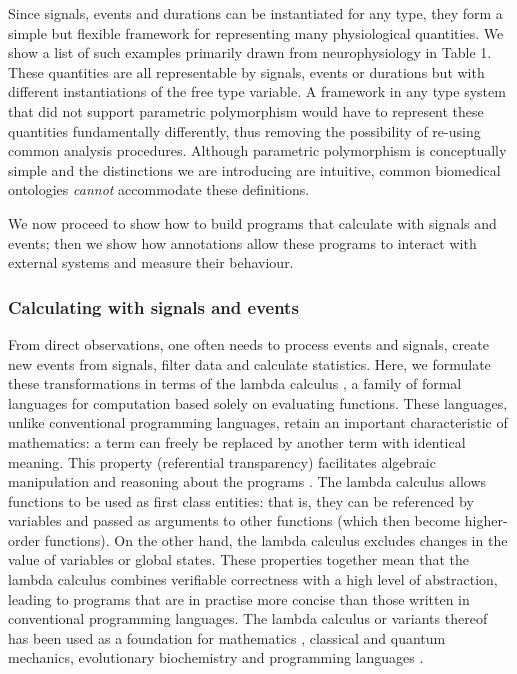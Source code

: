 \documentclass[11pt]{article}
\begin{document}
Since signals, events and durations can be instantiated for any type,
they form a simple but flexible framework for representing many
physiological quantities. We show a list of such examples primarily
drawn from neurophysiology in Table 1. These quantities are all
representable by signals, events or durations but with different
instantiations of the free type variable. A framework in any type
system that did not support parametric polymorphism would have to
represent these quantities fundamentally differently, thus removing
the possibility of re-using common analysis procedures. Although
parametric polymorphism is conceptually simple and the distinctions we
are introducing are intuitive, common biomedical ontologies
\emph{cannot} accommodate these definitions. 

We now proceed to show how to build programs that calculate with
signals and events; then we show how annotations allow these programs
to interact with external systems and measure their behaviour.

\subsubsection*{Calculating with signals and events}

From direct observations, one often needs to process events and
signals, create new events from signals, filter data and calculate
statistics. Here, we formulate these transformations in terms of the
lambda calculus \cite{Church1941}, a family of formal languages for
computation based solely on evaluating functions.  These languages,
unlike conventional programming languages, retain an important
characteristic of mathematics: a term can freely be replaced by
another term with identical meaning.
This property (referential transparency\cite{Whitehead1927})
facilitates algebraic manipulation and reasoning about the programs
\cite{Bird1996}. The lambda calculus allows functions to be used as
first class entities: that is, they can be referenced by variables and
passed as arguments to other functions (which then become higher-order
functions). On the other hand, the lambda calculus excludes changes in
the value of variables or global states. These properties together
mean that the lambda calculus combines verifiable correctness with a
high level of abstraction, leading to programs that are in practise
more concise \cite{Hughes1989} than those written in conventional
programming languages. The lambda calculus or variants thereof has
been used as a foundation for mathematics \cite{Martin-Lof1985},
classical \cite{Sussman2001} and quantum \cite{Karczmarczuk2003}
mechanics, evolutionary biochemistry \cite{Fontana1994} and
programming languages \cite{McCarthy1960}.
\end{document}
